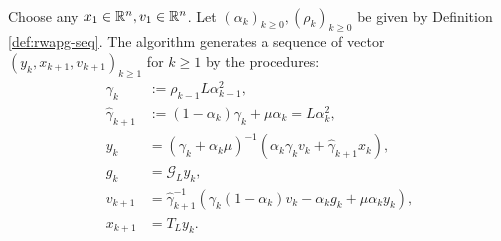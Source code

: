 \documentclass[12pt]{article}
\begin{document}
\begin{observation}
    \end{observation}
    \begin{definition}\label{def:wapg}
        \; \\
        Choose any $x_1 \in \mathbb R^n, v_1 \in \mathbb R^n$. 
        Let $(\alpha_k)_{k \ge0}, (\rho_k)_{k \ge 0}$ be given by Definition \ref{def:rwapg-seq}. 
        The algorithm generates a sequence of vector $(y_k, x_{k + 1}, v_{k + 1})_{k \ge 1}$ for $k\ge 1$ by the procedures:  
        \begin{align*}
            \gamma_k &:= \rho_{k -1}L\alpha_{k - 1}^2, 
            \\
            \hat \gamma_{k + 1} & := (1 - \alpha_k)\gamma_k + \mu \alpha_k = L\alpha_k^2, 
            \\
            y_k &= 
            (\gamma_k + \alpha_k \mu)^{-1}(\alpha_k \gamma_k v_k + \hat\gamma_{k + 1} x_k), 
            \\
            g_k &= \mathcal G_L y_k, 
            \\
            v_{k + 1} &= 
            \hat\gamma^{-1}_{k + 1}
            (\gamma_k(1 - \alpha_k) v_k - \alpha_k g_k + \mu \alpha_k y_k), 
            \\
            x_{k + 1} &= T_L y_k. 
        \end{align*}
    \end{definition}
\end{document}
